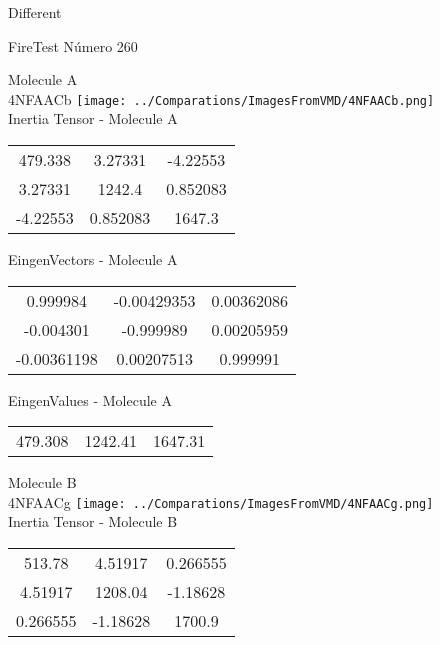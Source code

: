 \begin{center}
\vtab
\vtab
\textcolor{NavyBlue}{\Large Different}
\end{center}

 \newpage

\vtab[-2cm]
\begin{center}
{\large FireTest \tab Número 260}
\end{center}
\begin{multicols}{2}
\begin{center}

Molecule A \\ 
4NFAACb
\texttt{[image: ../Comparations/ImagesFromVMD/4NFAACb.png]}
\\
Inertia Tensor - Molecule A \\
\vtab

\begin{tabular}{|c c c|}
479.338	 & 	3.27331	 & 	-4.22553	 \\
3.27331	 & 	1242.4	 & 	0.852083	 \\
-4.22553	 & 	0.852083	 & 	1647.3
\end{tabular}

\vtab
 EingenVectors - Molecule A     \\
\vtab
\begin{tabular}{|c c c|}
0.999984	 & 	-0.00429353	 & 	0.00362086	 \\
-0.004301	 & 	-0.999989	 & 	0.00205959	 \\
-0.00361198	 & 	0.00207513	 & 	0.999991
\end{tabular}

\vtab
 EingenValues - Molecule A     \\
\vtab
\begin{tabular}{|c c c|}
479.308	 & 	1242.41	 & 	1647.31	 \\
\end{tabular}
\columnbreak

Molecule B \\ 
4NFAACg
\texttt{[image: ../Comparations/ImagesFromVMD/4NFAACg.png]}
\\
Inertia Tensor - Molecule B \\
\vtab

\begin{tabular}{|c c c|}
513.78	 & 	4.51917	 & 	0.266555	 \\
4.51917	 & 	1208.04	 & 	-1.18628	 \\
0.266555	 & 	-1.18628	 & 	1700.9
\end{tabular}


\end{center}
\end{multicols}

